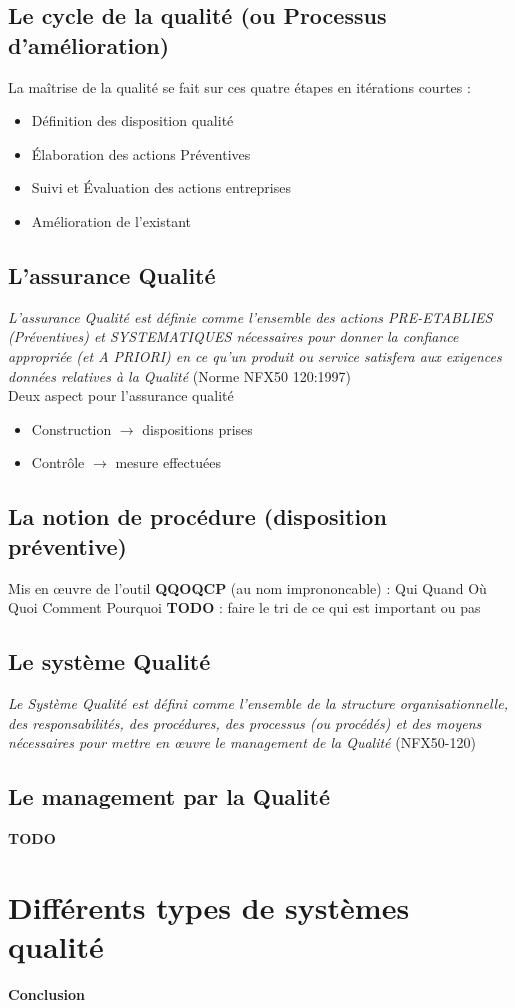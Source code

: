 	\subsection{Le cycle de la qualité (ou Processus d'amélioration)}
La maîtrise de la qualité se fait sur ces quatre étapes en itérations courtes : 
	\begin{itemize}
	\item Définition des disposition qualité
	\item Élaboration des actions Préventives
	\item Suivi et Évaluation des actions entreprises
	\item Amélioration de l’existant
	\end{itemize}

	\subsection{L'assurance Qualité}
\textit{L'assurance Qualité est définie comme l'ensemble des actions PRE-ETABLIES (Préventives) et SYSTEMATIQUES nécessaires pour donner la confiance appropriée (et A PRIORI) en ce qu'un produit ou service satisfera aux exigences données relatives à la Qualité} (Norme NFX50 120:1997)\\
Deux aspect pour l’assurance qualité
\begin{itemize}
\item Construction $\rightarrow$ dispositions prises
\item Contrôle $\rightarrow$ mesure effectuées
\end{itemize}



	\subsection{La notion de procédure (disposition préventive)}
Mis en \oe{}uvre de l’outil \textbf{QQOQCP} (au nom imprononcable) : Qui Quand Où Quoi Comment Pourquoi
\textbf{TODO} : faire le tri de ce qui est important ou pas

	\subsection{Le système Qualité}
\textit{Le Système Qualité est défini comme l'ensemble de la structure organisationnelle,
des responsabilités, des procédures, des processus (ou procédés) et des moyens
nécessaires pour mettre en \oe{}uvre le management de la Qualité }(NFX50-120)


	\subsection{Le management par la Qualité}
\textbf{TODO}

\section{Différents types de systèmes qualité}

\textbf{Conclusion}
